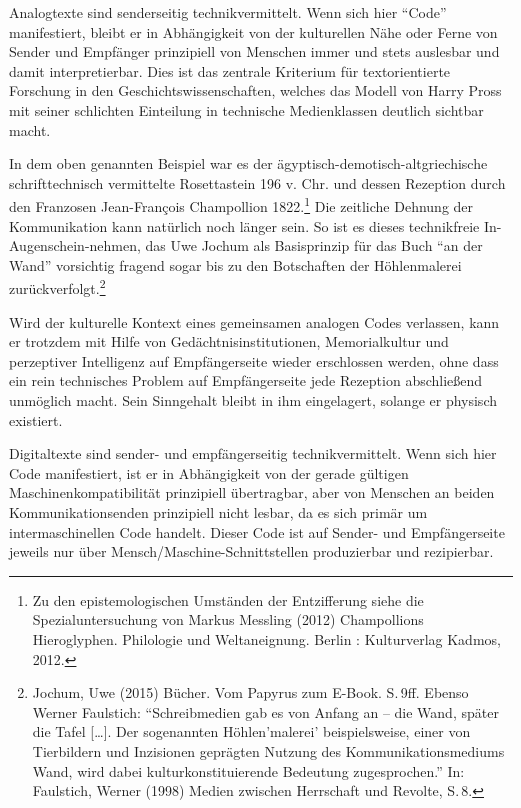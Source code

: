 \documentclass[a4paper,
fontsize=11pt,
oneside,
numbers=noperiodatend,
parskip=half-,
bibliography=totoc,
final
]{scrartcl}
\begin{document}
Analogtexte sind senderseitig technikvermittelt. Wenn sich hier
\enquote{Code} manifestiert, bleibt er in Abhängigkeit von der
kulturellen Nähe oder Ferne von Sender und Empfänger prinzipiell von
Menschen immer und stets auslesbar und damit interpretierbar. Dies ist
das zentrale Kriterium für textorientierte Forschung in den
Geschichtswissenschaften, welches das Modell von Harry Pross mit seiner
schlichten Einteilung in technische Medienklassen deutlich sichtbar
macht.

In dem oben genannten Beispiel war es der
ägyptisch-demotisch-altgriechische schrifttechnisch vermittelte
Rosettastein 196 v. Chr. und dessen Rezeption durch den Franzosen
Jean-François Champollion 1822.\footnote{Zu den epistemologischen
  Umständen der Entzifferung siehe die Spezialuntersuchung von Markus
  Messling (2012) Champollions Hieroglyphen. Philologie und
  Weltaneignung. Berlin : Kulturverlag Kadmos, 2012.} Die zeitliche
Dehnung der Kommunikation kann natürlich noch länger sein. So ist es
dieses technikfreie In-Augenschein-nehmen, das Uwe Jochum als
Basisprinzip für das Buch \enquote{an der Wand} vorsichtig fragend sogar
bis zu den Botschaften der Höhlenmalerei zurückverfolgt.\footnote{Jochum,
  Uwe (2015) Bücher. Vom Papyrus zum E-Book. S.\,9ff. Ebenso Werner
  Faulstich: \enquote{Schreibmedien gab es von Anfang an -- die Wand,
  später die Tafel {[}\ldots{}{]}. Der sogenannten Höhlen'malerei'
  beispielsweise, einer von Tierbildern und Inzisionen geprägten Nutzung
  des Kommunikationsmediums Wand, wird dabei kulturkonstituierende
  Bedeutung zugesprochen.} In: Faulstich, Werner (1998) Medien zwischen
  Herrschaft und Revolte, S.\,8.}

Wird der kulturelle Kontext eines gemeinsamen analogen Codes verlassen,
kann er trotzdem mit Hilfe von Gedächtnisinstitutionen, Memorialkultur
und perzeptiver Intelligenz auf Empfängerseite wieder erschlossen
werden, ohne dass ein rein technisches Problem auf Empfängerseite jede
Rezeption abschließend unmöglich macht. Sein Sinngehalt bleibt in ihm
eingelagert, solange er physisch existiert.

Digitaltexte sind sender- und empfängerseitig technikvermittelt. Wenn
sich hier Code manifestiert, ist er in Abhängigkeit von der gerade
gültigen Maschinenkompatibilität prinzipiell übertragbar, aber von
Menschen an beiden Kommunikationsenden prinzipiell nicht lesbar, da es
sich primär um intermaschinellen Code handelt. Dieser Code ist auf
Sender- und Empfängerseite jeweils nur über
Mensch/Maschine-Schnitt\-stellen produzierbar und rezipierbar.
\end{document}
